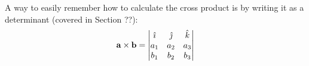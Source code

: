 \documentclass[../main.tex]{subfiles}
\begin{document}
\begin{remark}
	A way to easily remember how to calculate the cross product is by writing
	it as a determinant (covered in Section ??):
	$$\mathbf{a}\times\mathbf{b}=\begin{vmatrix}
			\hat{\imath} & \hat{\jmath} & \hat{k} \\
			a_1           & a_2           & a_3      \\
			b_1           & b_2           & b_3
		\end{vmatrix}$$
\end{remark}
\end{document}

